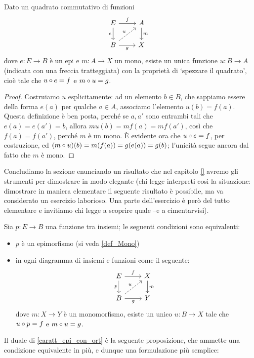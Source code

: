 \begin{proposition}
	Dato un quadrato commutativo di funzioni
	\[\begin{tikzcd}
			E \ar[r,"f"]\ar[d, "e"']& A\ar[d, "m"] \\
			B \ar[r, "g"']\ar[ur,dashed,"u"] & X
		\end{tikzcd}\]
	dove \(e : E\to B\) è un epi e \(m : A \to X\) un mono, esiste un unica funzione \(u : B\to A\) (indicata con una freccia tratteggiata) con la proprietà di `spezzare il quadrato', cioè tale che \(u\circ e=f\) e \(m\circ u=g\).
\end{proposition}
\begin{proof}
	Costruiamo \(u\) esplicitamente: ad un elemento \(b\in B\), che sappiamo essere della forma \(e(a)\) per qualche \(a\in A\), associamo l'elemento \(u(b)=f(a)\). Questa definizione è ben posta, perché se \(a,a'\) sono entrambi tali che \(e(a)=e(a')=b\), allora \(mu(b)=mf(a)=mf(a')\), così che \(f(a)=f(a')\), perché \(m\) è un mono. \`E evidente ora che \(u\circ e= f\), per costruzione, ed \((m\circ u)(b)=m(f(a))=g(e(a))=g(b)\); l'unicità segue ancora dal fatto che \(m\) è mono.
\end{proof}
Concludiamo la sezione enunciando un risultato che nel capitolo \ref{} avremo gli strumenti per dimostrare in modo elegante (chi legge interpreti così la situazione: dimostrare in maniera elementare il seguente risultato è possibile, ma va considerato un esercizio laborioso. Una parte dell'esercizio è però del tutto elementare e invitiamo chi legge a scoprire quale --e a cimentarvisi).
\begin{proposition}\label{caratt_epi_con_ort}
	Sia \(p : E \to B\) una funzione tra insiemi; le seguenti condizioni sono equivalenti:
	\begin{itemize}
		\item \(p\) è un epimorfismo (si veda \ref{def_Mono})
		\item in ogni diagramma di insiemi e funzioni come il seguente:
		      \[\begin{tikzcd}
				      E \ar[r, "f"]\ar[d, "p"']& X \ar[d, "m"]\\
				      B \ar[r, "g"'] \ar[ur, dashed, "u"]& Y
			      \end{tikzcd}\]
		      dove \(m : X\to Y\) è un monomorfismo, esiste un unico \(u : B\to X\) tale che \(u\circ p = f\) e \(m\circ u = g\).
	\end{itemize}
\end{proposition}
Il duale di \ref{caratt_epi_con_ort} è la seguente proposizione, che ammette una condizione equivalente in più, e dunque una formulazione più semplice:
